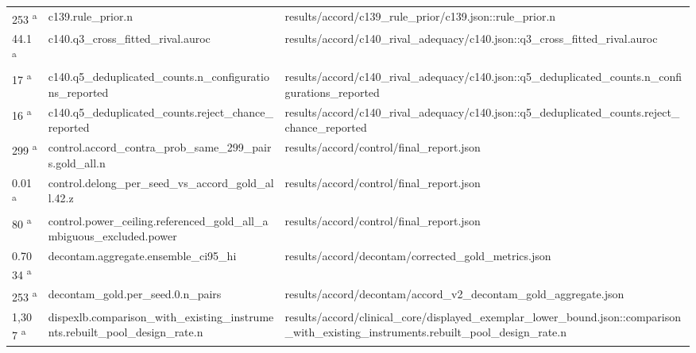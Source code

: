 \begin{longtable}{@{}p{0.7in}p{1.9in}p{2.6in}@{}}
253 \textsuperscript{a} & c139.\allowbreak{}rule\_prior.\allowbreak{}n & results/\allowbreak{}accord/\allowbreak{}c139\_rule\_prior/\allowbreak{}c139.\allowbreak{}json::rule\_prior.\allowbreak{}n\\
44.1 \textsuperscript{a} & c140.\allowbreak{}q3\_cross\_fitted\_rival.\allowbreak{}auroc & results/\allowbreak{}accord/\allowbreak{}c140\_rival\_adequacy/\allowbreak{}c140.\allowbreak{}json::q3\_cross\_fitted\_rival.\allowbreak{}auroc\\
17 \textsuperscript{a} & c140.\allowbreak{}q5\_deduplicated\_counts.\allowbreak{}n\_configurations\_reported & results/\allowbreak{}accord/\allowbreak{}c140\_rival\_adequacy/\allowbreak{}c140.\allowbreak{}json::q5\_deduplicated\_counts.\allowbreak{}n\_configurations\_reported\\
16 \textsuperscript{a} & c140.\allowbreak{}q5\_deduplicated\_counts.\allowbreak{}reject\_chance\_reported & results/\allowbreak{}accord/\allowbreak{}c140\_rival\_adequacy/\allowbreak{}c140.\allowbreak{}json::q5\_deduplicated\_counts.\allowbreak{}reject\_chance\_reported\\
299 \textsuperscript{a} & control.\allowbreak{}accord\_contra\_prob\_same\_299\_pairs.\allowbreak{}gold\_all.\allowbreak{}n & results/\allowbreak{}accord/\allowbreak{}control/\allowbreak{}final\_report.\allowbreak{}json\\
0.01 \textsuperscript{a} & control.\allowbreak{}delong\_per\_seed\_vs\_accord\_gold\_all.\allowbreak{}42.\allowbreak{}z & results/\allowbreak{}accord/\allowbreak{}control/\allowbreak{}final\_report.\allowbreak{}json\\
80 \textsuperscript{a} & control.\allowbreak{}power\_ceiling.\allowbreak{}referenced\_gold\_all\_ambiguous\_excluded.\allowbreak{}power & results/\allowbreak{}accord/\allowbreak{}control/\allowbreak{}final\_report.\allowbreak{}json\\
0.7034 \textsuperscript{a} & decontam.\allowbreak{}aggregate.\allowbreak{}ensemble\_ci95\_hi & results/\allowbreak{}accord/\allowbreak{}decontam/\allowbreak{}corrected\_gold\_metrics.\allowbreak{}json\\
253 \textsuperscript{a} & decontam\_gold.\allowbreak{}per\_seed.\allowbreak{}0.\allowbreak{}n\_pairs & results/\allowbreak{}accord/\allowbreak{}decontam/\allowbreak{}accord\_v2\_decontam\_gold\_aggregate.\allowbreak{}json\\
1,307 \textsuperscript{a} & dispexlb.\allowbreak{}comparison\_with\_existing\_instruments.\allowbreak{}rebuilt\_pool\_design\_rate.\allowbreak{}n & results/\allowbreak{}accord/\allowbreak{}clinical\_core/\allowbreak{}displayed\_exemplar\_lower\_bound.\allowbreak{}json::comparison\_with\_existing\_instruments.\allowbreak{}rebuilt\_pool\_design\_rate.\allowbreak{}n\\

\end{longtable}
